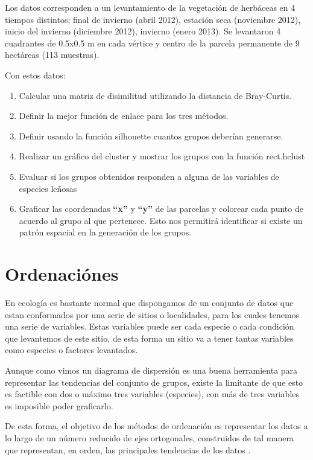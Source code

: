 \documentclass[]{book}
\begin{document}
Los datos corresponden a un levantamiento de la vegetación de herbáceas
en 4 tiempos distintos; final de invierno (abril 2012), estación seca
(noviembre 2012), inicio del invierno (diciembre 2012), invierno (enero
2013). Se levantaron 4 cuadrantes de 0.5x0.5 m en cada vértice y centro
de la parcela permanente de 9 hectáreas (113 muestras).

Con estos datos:

\begin{enumerate}
\def\labelenumi{\arabic{enumi}.}
\item
  Calcular una matriz de disimilitud utilizando la distancia de
  Bray-Curtis.
\item
  Definir la mejor función de enlace para los tres métodos.
\item
  Definir usando la función silhouette cuantos grupos deberían
  generarse.
\item
  Realizar un gráfico del cluster y mostrar los grupos con la función
  rect.hclust
\item
  Evaluar si los grupos obtenidos responden a alguna de las variables de
  especies leñosas
\item
  Graficar las coordenadas \textbf{``x''} y \textbf{``y''} de las
  parcelas y colorear cada punto de acuerdo al grupo al que pertenece.
  Esto nos permitirá identificar si existe un patrón espacial en la
  generación de los grupos.
\end{enumerate}

\chapter{Ordenaciónes}\label{ordenaciones}

En ecología es bastante normal que dispongamos de un conjunto de datos
que estan conformados por una serie de sitios o localidades, para los
cuales tenemos una serie de variables. Estas variables puede ser cada
especie o cada condición que levantemos de este sitio, de esta forma un
sitio va a tener tantas variables como especies o factores levantados.

Aunque como vimos un diagrama de dispersión es una buena herramienta
para representar las tendencias del conjunto de grupos, existe la
limitante de que esto es factible con dos o máximo tres variables
(especies), con más de tres variables es imposible poder graficarlo.

De esta forma, el objetivo de los métodos de ordenación es representar
los datos a lo largo de un número reducido de ejes ortogonales,
construidos de tal manera que representan, en orden, las principales
tendencias de los datos \citep{Borcard2011}.
\end{document}
